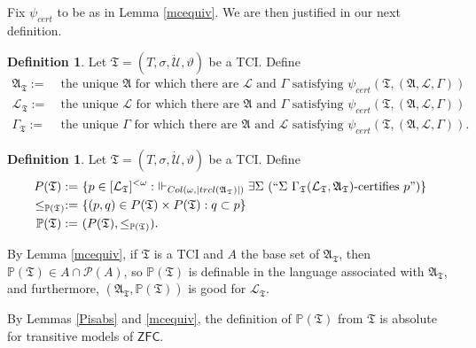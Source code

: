 \documentclass[12pt, twoside]{memoir}
\numberwithin{equation}{section}
\theoremstyle{definition}
\newtheorem{defi}[thm]{Definition}
\theoremstyle{remark}
\theoremstyle{definition}
\theoremstyle{definition}
\theoremstyle{definition}
\theoremstyle{remark}
\begin{document}
Fix $\psi_{cert}$ to be as in Lemma \ref{mcequiv}. We are then justified in our next definition.

\begin{defi}
Let $\mathfrak{T} = (T, \sigma, \dot{\mathcal{U}}, \vartheta)$ be a TCI. Define
\begin{align*}
    \mathfrak{A}_{\mathfrak{T}} := \ & \text{the unique } \mathfrak{A} \text{ for which there are } \mathcal{L} \text{ and } \Gamma \text{ satisfying } \psi_{cert}(\mathfrak{T}, (\mathfrak{A}, \mathcal{L}, \Gamma)) \\
    \mathcal{L}_{\mathfrak{T}} := \ & \text{the unique } \mathcal{L} \text{ for which there are } \mathfrak{A} \text{ and } \Gamma \text{ satisfying } \psi_{cert}(\mathfrak{T}, (\mathfrak{A}, \mathcal{L}, \Gamma)) \\
    \Gamma_{\mathfrak{T}} := \ & \text{the unique } \Gamma \text{ for which there are } \mathfrak{A} \text{ and } \mathcal{L} \text{ satisfying } \psi_{cert}(\mathfrak{T}, (\mathfrak{A}, \mathcal{L}, \Gamma)) \text{.}
\end{align*}
\end{defi}

\begin{defi}
Let $\mathfrak{T} = (T, \sigma, \dot{\mathcal{U}}, \vartheta)$ be a TCI. Define \begin{align*}
    P(\mathfrak{T}) := \ & \{p \in [\mathcal{L}_{\mathfrak{T}}]^{< \omega} : \ \Vdash_{Col(\omega, |trcl(\mathfrak{A}_{\mathfrak{T}})|)} \exists \Sigma \ (``\Sigma \ \Gamma_{\mathfrak{T}} (\mathcal{L}_{\mathfrak{T}}, \mathfrak{A}_{\mathfrak{T}})\text{-certifies } p")\} \\
    \leq_{\mathbb{P}(\mathfrak{T})} := \ & \{(p, q) \in P(\mathfrak{T}) \times P(\mathfrak{T}) : q \subset p\} \\
    \mathbb{P}(\mathfrak{T}) := \ & (P(\mathfrak{T}), \leq_{\mathbb{P}(\mathfrak{T})}) \text{.}
\end{align*}
\end{defi}

By Lemma \ref{mcequiv}, if $\mathfrak{T}$ is a TCI and $A$ the base set of $\mathfrak{A}_{\mathfrak{T}}$, then $\mathbb{P}(\mathfrak{T}) \in A \cap \mathcal{P}(A)$, so $\mathbb{P}(\mathfrak{T})$ is definable in the language associated with $\mathfrak{A}_{\mathfrak{T}}$, and furthermore, $(\mathfrak{A}_{\mathfrak{T}}, \mathbb{P}(\mathfrak{T}))$ is good for $\mathcal{L}_{\mathfrak{T}}$.

By Lemmas \ref{Pisabs} and \ref{mcequiv}, the definition of $\mathbb{P}(\mathfrak{T})$ from $\mathfrak{T}$ is absolute for transitive models of $\mathsf{ZFC}$.
\end{document}
